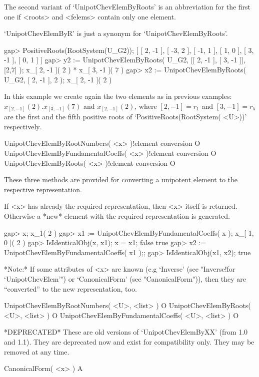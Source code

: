 The second variant of `UnipotChevElemByRoots' is an abbreviation  for the
first one if <roots> and <felems> contain only one element.

`UnipotChevElemByR' is just a synonym for `UnipotChevElemByRoots'.

\beginexample
gap> PositiveRoots(RootSystem(U_G2));
[ [ 2, -1 ], [ -3, 2 ], [ -1, 1 ], [ 1, 0 ], [ 3, -1 ], [ 0, 1 ] ]
gap> y2 := UnipotChevElemByRoots( U_G2, [[ 2, -1 ], [ 3, -1 ]], [2,7] );
x_{[ 2, -1 ]}( 2 ) * x_{[ 3, -1 ]}( 7 )
gap> x2 := UnipotChevElemByRoots( U_G2, [ 2, -1 ], 2 );
x_{[ 2, -1 ]}( 2 )
\endexample

In this example we create again the two elements as in previous examples:
$x_{[ 2, -1 ]}( 2 ) . x_{[ 3, -1 ]}( 7 )$ and $x_{[ 2, -1 ]}( 2 )$, where
$[ 2, -1 ]  =  r_1$  and $[ 3, -1 ] =  r_5$ are the  first  and the fifth
positive roots of `PositiveRoots(RootSystem( <U>))' respectively.


\>UnipotChevElemByRootNumbers( <x> )!{element conversion} O
\>UnipotChevElemByFundamentalCoeffs( <x> )!{element conversion} O
\>UnipotChevElemByRoots( <x> )!{element conversion} O

These three methods are  provided  for converting a unipotent element  to
the respective representation.

If  <x>  has  already  the required representation,  then  <x>  itself is
returned. Otherwise  a *new* element  with the required representation is
generated.

\beginexample
gap> x;
x_{1}( 2 )
gap> x1 := UnipotChevElemByFundamentalCoeffs( x );
x_{[ 1, 0 ]}( 2 )
gap> IsIdenticalObj(x, x1); x = x1;
false
true
gap> x2 := UnipotChevElemByFundamentalCoeffs( x1 );;
gap> IsIdenticalObj(x1, x2);
true
\endexample

*Note:*  If  some  attributes  of  <x>  are  known  (e.g  `Inverse'  (see
"Inverse!for     `UnipotChevElem'")      or     `CanonicalForm'      (see
"CanonicalForm")), then they are ``converted'' to the new representation,
too.


\){\fmark}UnipotChevElemByRootNumbers( <U>, <list> ) O
\){\fmark}UnipotChevElemByRoots( <U>, <list> ) O
\){\fmark}UnipotChevElemByFundamentalCoeffs( <U>, <list> ) O

*DEPRECATED*  These   are  old  versions  of  `UnipotChevElemByXX'  (from
{\Unipot}  1.0   and  1.1).  They  are  deprecated  now  and   exist  for
compatibility only. They may be removed at any time.



\>CanonicalForm( <x> ) A

